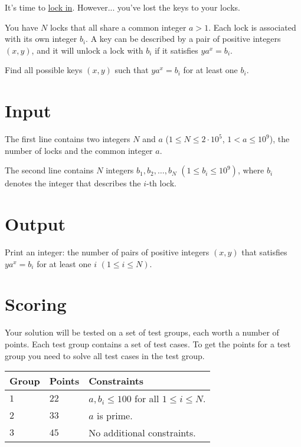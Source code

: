 
\noindent
It's time to \uline{lock in}. However... you've lost the keys to your locks.

You have $N$ locks that all share a common integer $a > 1$. Each lock is associated with its own integer $b_i$.
A key can be described by a pair of positive integers $(x,y)$, and it will unlock a lock with $b_i$ if it satisfies $ya^x = b_i$.

Find all possible keys $(x,y)$ such that $ya^x = b_i$ for at least one $b_i$.

\section*{Input}
The first line contains two integers $N$ and $a$ ($1 \leq N \leq 2 \cdot 10^5$, $1 < a \leq 10^9$), the number of locks and the common integer $a$.

The second line contains $N$ integers $b_1, b_2, \dots, b_N$ $(1 \leq b_i \leq 10^9)$, where $b_i$ denotes the integer that describes the $i$-th lock.

\section*{Output}
Print an integer: the number of pairs of positive integers $(x,y)$ that satisfies $ya^x = b_i$ for at least one $i$ $(1\leq i \leq N)$.

\section*{Scoring}
Your solution will be tested on a set of test groups, each worth a number of points. Each test group contains
a set of test cases. To get the points for a test group you need to solve all test cases in the test group.

\noindent
\begin{tabular}{| l | l | p{12cm} |}
  \hline
  \textbf{Group} & \textbf{Points} & \textbf{Constraints} \\ \hline
  $1$    & $22$       & $a, b_i \leq 100$ for all $1 \leq i \leq N$. \\ \hline
  $2$    & $33$       & $a$ is prime. \\ \hline
  $3$    & $45$       & No additional constraints. \\ \hline
\end{tabular}

